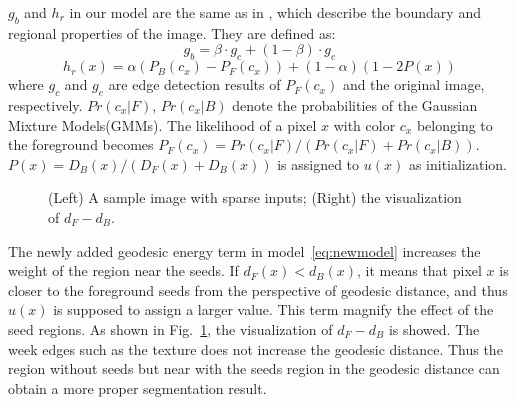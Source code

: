 \documentclass{article}
\begin{document}
$g_b$ and $h_r$ in our model are the same as in \cite{nguyen2012robust}, which describe the boundary and regional properties of the image. They are defined as:
\begin{equation} \label{eq:gb}
    g_b = \beta\cdot g_c + (1 - \beta)\cdot g_e
\end{equation}
\begin{equation} \label{eq:hr}
    h_r(x) = \alpha(P_B(c_x) - P_F(c_x)) + (1 - \alpha)(1 - 2P(x))
\end{equation}
where $g_c$ and $g_e$ are edge detection results of $P_F(c_x)$ and the original image, respectively. $Pr(c_x|F)$, $Pr(c_x|B)$ denote the probabilities of the Gaussian Mixture Models(GMMs). The likelihood of a pixel $x$ with color $c_x$ belonging to the foreground becomes $P_F(c_x)={Pr(c_x|F)}/(Pr(c_x|F)+Pr(c_x|B))$. $P(x)=D_B(x)/(D_F(x)+D_B(x))$ is assigned to $u(x)$ as initialization.

\begin{figure}[htbp]
\centering
{}
   \caption{ (Left) A sample image with sparse inputs; (Right) the visualization of $d_F-d_B$.}
\label{fig:fig2}
\end{figure}

The newly added geodesic energy term in model~\eqref{eq:newmodel} increases the weight of the region near the seeds. If $d_F(x) < d_B(x)$, it means that pixel $x$ is closer to the foreground seeds from the perspective of geodesic distance, and thus $u(x)$ is supposed to assign a larger value. This term magnify the effect of the seed regions. As shown in Fig.~\ref{fig:fig2}, the visualization of $d_F-d_B$ is showed. The week edges such as the texture does not increase the geodesic distance. Thus the region without seeds but near with the seeds region in the geodesic distance can obtain a more proper segmentation result.
\end{document}
